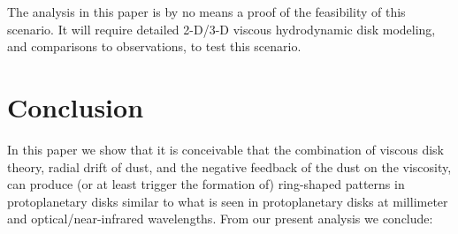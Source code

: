 \documentclass{aa}
\newcommand{\revised}[1]{{#1}}
\begin{document}
\revised{The analysis in this paper} is
by no means a proof of the feasibility of this scenario. It will require
detailed 2-D/3-D viscous hydrodynamic disk modeling, and comparisons to
observations, to test this scenario.

\section{Conclusion}
\revised{In this paper we} show that it is conceivable that the combination
of viscous disk theory, radial drift of dust, and the negative feedback of the
dust on the viscosity, can produce (or at least trigger the formation of)
ring-shaped patterns in protoplanetary disks similar to what is seen in
protoplanetary disks at millimeter and optical/near-infrared wavelengths. 
\revised{From our present analysis we conclude:}
\end{document}
